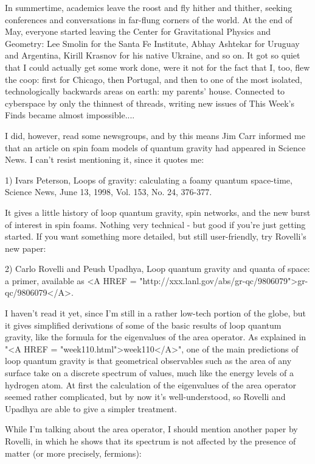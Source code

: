 

In summertime, academics leave the roost and fly hither and thither,
seeking conferences and conversations in far-flung corners of the 
world.  At the end of May, everyone started leaving the Center
for Gravitational Physics and Geometry: Lee Smolin for the Santa Fe 
Institute, Abhay Ashtekar for Uruguay and Argentina, Kirill Krasnov for
his native Ukraine, and so on.  It got so quiet that I could actually 
get some work done, were it not for the fact that I, too, flew the coop: 
first for Chicago, then Portugal, and then to one of the most isolated, 
technologically backwards areas on earth: my parents' house.  Connected
to cyberspace by only the thinnest of threads, writing new issues of This 
Week's Finds became almost impossible....

I did, however, read some newsgroups, and by this means Jim Carr 
informed me that an article on spin foam models of quantum gravity had 
appeared in Science News.  I can't resist mentioning it, since it 
quotes me:

1) Ivars Peterson, Loops of gravity: calculating a foamy quantum
space-time, Science News, June 13, 1998, Vol. 153, No. 24, 376-377. 

It gives a little history of loop quantum gravity, spin networks,
and the new burst of interest in spin foams.  Nothing very technical -
but good if you're just getting started.  If you want something more 
detailed, but still user-friendly, try Rovelli's new paper: 

2) Carlo Rovelli and Peush Upadhya, Loop quantum gravity and quanta of
space: a primer, available as <A HREF =
"http://xxx.lanl.gov/abs/gr-qc/9806079">gr-qc/9806079</A>.

I haven't read it yet, since I'm still in a rather low-tech portion of
the globe, but it gives simplified derivations of some of the basic
results of loop quantum gravity, like the formula for the eigenvalues of
the area operator.  As explained in "<A HREF =
"week110.html">week110</A>", one of the main predictions of loop
quantum gravity is that geometrical observables such as the area of any
surface take on a discrete spectrum of values, much like the energy
levels of a hydrogen atom.  At first the calculation of the eigenvalues
of the area operator seemed rather complicated, but by now it's
well-understood, so Rovelli and Upadhya are able to give a simpler
treatment.

While I'm talking about the area operator, I should mention another
paper by Rovelli, in which he shows that its spectrum is not affected
by the presence of matter (or more precisely, fermions):


